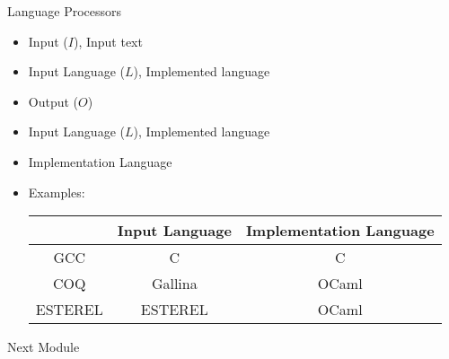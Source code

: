 \documentclass{beamer}
\begin{document}
\begin{frame}{Language Processors}

\begin{center}
\end{center}
\begin{scriptsize}

\pause
\begin{itemize}
\item Input ($I$), Input text
\item Input Language ($L$), Implemented language
\item Output ($O$)
\end{itemize}

\pause
{}
\begin{itemize}
\item Input Language ($L$), Implemented language
\item Implementation Language
\pause
\item Examples:
\begin{center}
\begin{tabular}{|c|c|c|}
\hline
 & Input Language & Implementation Language \\
\hline
GCC & C & C \\
COQ & Gallina & OCaml \\
ESTEREL & ESTEREL & OCaml \\
\hline
\end{tabular}
\end{center}
\end{itemize}
\end{scriptsize}
\end{frame}


\begin{frame}{Next Module}

\end{frame}
\end{document}
